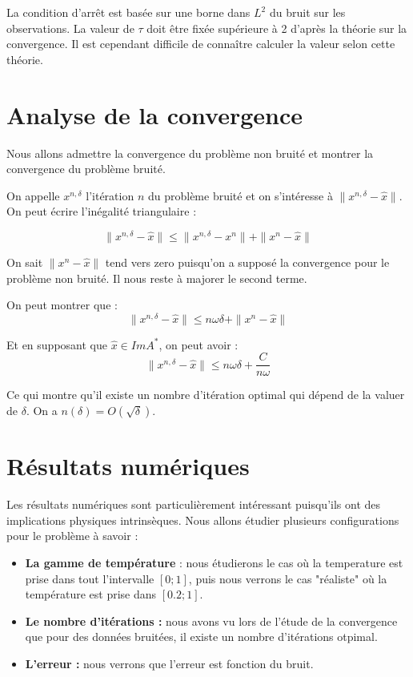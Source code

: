 \documentclass[a4paper,10pt]{article}
\begin{document}
La condition d'arr\^et est basée sur une borne dans $L^2$ du bruit sur les observations. La valeur de $\tau$ doit \^etre fixée supérieure à 2 d'après la théorie sur la convergence. Il est cependant difficile de connaître calculer la valeur selon cette théorie.


\section{Analyse de la convergence}
Nous allons admettre la convergence du problème non bruité et montrer la	 convergence du problème bruité.

On appelle $x^{n, \delta}$ l'itération $n$ du problème bruité et on s'intéresse à $\|x^{n,\delta} - \hat{x} \|$. On peut écrire l'inégalité triangulaire :

\[
\|x^{n,\delta} - \hat{x} \| \leq \|x^{n,\delta} - x^n \| + \|x^n - \hat{x} \|
\]

On sait $\|x^n - \hat{x} \|$ tend vers zero puisqu'on a supposé la convergence pour le problème non bruité. Il nous reste à majorer le second terme.

On peut montrer que :
\[
\|x^{n,\delta} - \hat{x} \| \leq n\omega \delta + \|x^n - \hat{x} \|
\]

Et en supposant que $\hat{x} \in ImA^*$, on peut avoir :
\[
\|x^{n,\delta} - \hat{x} \| \leq n\omega \delta + \frac{C}{n \omega}
\]

Ce qui montre qu'il existe un nombre d'itération optimal qui dépend de la valuer de $\delta$. On a $n(\delta)=O(\sqrt{\delta})$.


\section{Résultats numériques}

Les résultats numériques sont particulièrement intéressant puisqu'ils ont des implications physiques intrinsèques. Nous allons étudier plusieurs configurations pour le problème à savoir :
\begin{itemize}
\item \textbf{La gamme de température} : nous étudierons le cas où la temperature est prise dans tout l'intervalle $[0;1]$, puis nous verrons le cas "réaliste" où la température est prise dans $[0.2;1]$.
\item \textbf{Le nombre d'itérations :} nous avons vu lors de l'étude de la convergence que pour des données bruitées, il existe un nombre d'itérations otpimal.
\item \textbf{L'erreur :} nous verrons que l'erreur est fonction du bruit.
\end{itemize}
\end{document}

